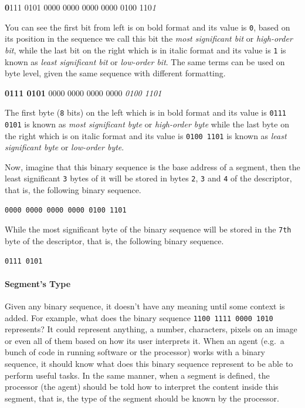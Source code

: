 \textbf{0}111 0101 0000 0000 0000 0000 0100 110\emph{1}

You can see the first bit from left is on bold format and its value is
\lstinline!0!, based on its position in the sequence we call this bit
the \emph{most significant bit} or \emph{high-order bit}, while the last
bit on the right which is in italic format and its value is
\lstinline!1! is known as \emph{least significant bit} or
\emph{low-order bit}. The same terms can be used on byte level, given
the same sequence with different formatting.

\textbf{0111 0101} 0000 0000 0000 0000 \emph{0100 1101}

The first byte (\lstinline!8! bits) on the left which is in bold format
and its value is \lstinline!0111 0101! is known as \emph{most
significant byte} or \emph{high-order byte} while the last byte on the
right which is on italic format and its value is \lstinline!0100 1101!
is known as \emph{least significant byte} or \emph{low-order byte}.

Now, imagine that this binary sequence is the base address of a segment,
then the least significant \lstinline!3! bytes of it will be stored in
bytes \lstinline!2!, \lstinline!3! and \lstinline!4! of the descriptor,
that is, the following binary sequence.

\begin{lstlisting}
0000 0000 0000 0000 0100 1101
\end{lstlisting}

While the most significant byte of the binary sequence will be stored in
the \lstinline!7th! byte of the descriptor, that is, the following
binary sequence.

\begin{lstlisting}
0111 0101
\end{lstlisting}

\paragraph{Segment's Type}\label{segments-type}

Given any binary sequence, it doesn't have any meaning until some
context is added. For example, what does the binary sequence
\lstinline!1100 1111 0000 1010! represents? It could represent anything,
a number, characters, pixels on an image or even all of them based on
how its user interprets it. When an agent (e.g.~a bunch of code in
running software or the processor) works with a binary sequence, it
should know what does this binary sequence represent to be able to
perform useful tasks. In the same manner, when a segment is defined, the
processor (the agent) should be told how to interpret the content inside
this segment, that is, the type of the segment should be known by the
processor.

